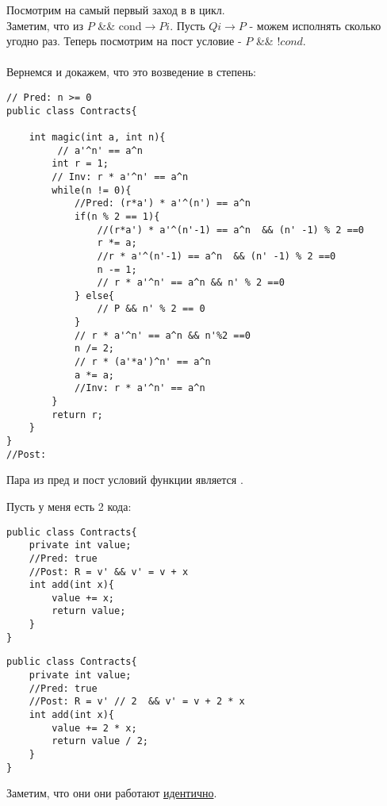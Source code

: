 Посмотрим на самый первый заход в в цикл. \\ 
Заметим, что из $P$ \&\& cond$ \rightarrow Pi$. Пусть $Qi \rightarrow P$ - можем исполнять сколько угодно раз. Теперь посмотрим на пост условие -  $P$ \&\& $!cond$.
\\\\
Вернемся и докажем, что это возведение в степень:

\begin{verbatim}
// Pred: n >= 0
public class Contracts{

    int magic(int a, int n){
         // a'^n' == a^n
        int r = 1;
        // Inv: r * a'^n' == a^n
        while(n != 0){
            //Pred: (r*a') * a'^(n') == a^n
            if(n % 2 == 1){
                //(r*a') * a'^(n'-1) == a^n  && (n' -1) % 2 ==0
                r *= a;
                //r * a'^(n'-1) == a^n  && (n' -1) % 2 ==0
                n -= 1;
                // r * a'^n' == a^n && n' % 2 ==0
            } else{
                // P && n' % 2 == 0
            }
            // r * a'^n' == a^n && n'%2 ==0
            n /= 2;
            // r * (a'*a')^n' == a^n
            a *= a;
            //Inv: r * a'^n' == a^n
        }
        return r;
    }
}
//Post: 
\end{verbatim}

Пара из пред и пост условий функции является .

Пусть у меня есть 2 кода:




\begin{minipage}[h]{0.5\linewidth}
  \begin{verbatim}
public class Contracts{
    private int value;
    //Pred: true 
    //Post: R = v' && v' = v + x
    int add(int x){
        value += x;
        return value;
    }
}
\end{verbatim}
\end{minipage}
\hfill 
\begin{minipage}[h]{0.5\linewidth}
\begin{verbatim}
public class Contracts{
    private int value;
    //Pred: true 
    //Post: R = v' // 2  && v' = v + 2 * x
    int add(int x){
        value += 2 * x;
        return value / 2;
    }
}
\end{verbatim}
\end{minipage}

Заметим, что они они работают \uline{идентично}.

